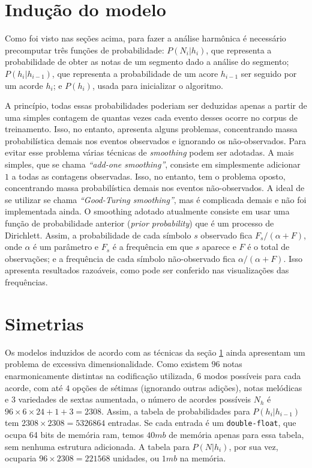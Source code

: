 \documentclass{article}
\begin{document}
\section{Indução do modelo}
\label{sec:modelo}

Como foi visto nas seções acima, para fazer a análise harmônica é
necessário precomputar três funções de probabilidade: $P(N_i|h_i)$,
que representa a probabilidade de obter as notas de um segmento dado a
análise do segmento; $P(h_i|h_{i-1})$, que representa a probabilidade
de um acore $h_{i-1}$ ser seguido por um acorde $h_i$; e $P(h_i)$,
usada para inicializar o algoritmo.

A princípio, todas essas probabilidades poderiam ser deduzidas apenas
a partir de uma simples contagem de quantas vezes cada evento desses
ocorre no corpus de treinamento. Isso, no entanto, apresenta alguns
problemas, concentrando massa probabilística demais nos eventos
observados e ignorando os não-observados. Para evitar esse problema
várias técnicas de \textit{smoothing} podem ser adotadas. A mais
simples, que se chama \textit{``add-one smoothing''}, consiste em
simplesmente adicionar $1$ a todas as contagens observadas. Isso, no
entanto, tem o problema oposto, concentrando massa probabilística
demais nos eventos não-observados. A ideal de se utilizar se chama
\textit{``Good-Turing smoothing''}, mas é complicada demais e não foi
implementada ainda. O smoothing adotado atualmente consiste em usar
uma função de probabilidade anterior (\textit{prior probability}) que
é um processo de Dirichlett. Assim, a probabilidade de cada símbolo
$s$ observado fica $F_s/(\alpha + F)$, onde $\alpha$ é um parâmetro e
$F_s$ é a frequência em que $s$ aparece e $F$ é o total de
observações; e a frequência de cada símbolo não-observado fica
$\alpha/(\alpha + F)$. Isso apresenta resultados razoáveis, como pode
ser conferido nas visualizações das frequências.

\section{Simetrias}
\label{sec:simetrias}

Os modelos induzidos de acordo com as técnicas da seção
\ref{sec:modelo} ainda apresentam um problema de excessiva
dimensionalidade. Como existem $96$ notas enarmonicamente distintas na
codificação utilizada, $6$ modos possíveis para cada acorde, com até
$4$ opções de sétimas (ignorando outras adições), notas melódicas e
$3$ variedades de sextas aumentada, o número de acordes possíveis
$N_h$ é $96 \times 6 \times 24 + 1 + 3 = 2308$. Assim, a tabela de
probabilidades para $P(h_i|h_{i-1})$ tem $2308 \times 2308 = 5326864$
entradas. Se cada entrada é um \texttt{double-float}, que ocupa 64
bits de memória ram, temos $40mb$ de memória apenas para essa tabela,
sem nenhuma estrutura adicionada. A tabela para $P(N|h_i)$, por sua
vez, ocuparia $96 \times 2308 = 221568$ unidades, ou $1mb$ na memória.
\end{document}
